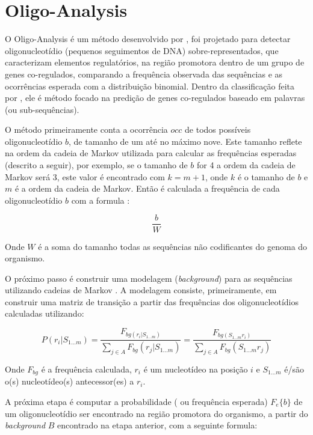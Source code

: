 \section{Oligo-Analysis}

O Oligo-Analysis é um método desenvolvido por \cite{Helden1998}, foi projetado para detectar oligonucleotídio (pequenos seguimentos de DNA) sobre-representados, que caracterizam elementos regulatórios, na região promotora dentro de um grupo de genes co-regulados, comparando a frequência observada das sequências e as ocorrências esperada com a distribuição binomial. Dentro da classificação feita por \cite{Das2007}, ele é método focado na predição de genes co-regulados baseado em palavras (ou sub-sequências). 

O método primeiramente conta a ocorrência $occ$ de todos possíveis oligonucleotídio $b$, de tamanho de um até no máximo nove. Este tamanho reflete na ordem da cadeia de Markov utilizada para calcular as frequências esperadas (descrito a seguir), por exemplo, se o tamanho de $b$ for 4 a ordem da cadeia de Markov será 3, este valor é encontrado com $k=m+1$, onde $k$ é o tamanho de $b$ e $m$ é a ordem da cadeia de Markov. Então é calculada a frequência de cada oligonucleotídio $b$ com a formula :

\begin{equation}
\frac{b}{W}
\end{equation}

Onde $W$ é a soma do tamanho todas as sequências não codificantes do genoma do organismo.

O próximo passo é construir uma modelagem (\textit{background}) para as sequências utilizando cadeias de Markov \cite{Ewens2005}. A modelagem consiste, primeiramente, em construir uma matriz de transição a partir das frequências dos oligonucleotídios calculadas utilizando:

\begin{equation}
	P(r_{i}|S_{1...m}) = \frac{F_{bg(r_{i}|S_{1...m})}}{\sum_{j\in A} F_{bg}(r_{j}|S_{1...m})} = \frac{F_{bg(S_{1...m}r_{i})}}{\sum_{j\in A} F_{bg}(S_{1...m}r_{j})}
\end{equation}

Onde $F_{bg}$ é a frequência calculada, $r_{i}$ é um nucleotídeo na posição $i$ e $S_{1...m}$ é/são o(s) nucleotídeo(s) antecessor(es) a $r_{i}$. 

A próxima etapa é computar a probabilidade ( ou frequência esperada) $F_{e}\{ b \}$ de um oligonucleotídio  ser encontrado na região promotora do organismo, a partir do \textit{background} $B$ encontrado na etapa anterior, com a seguinte formula:

